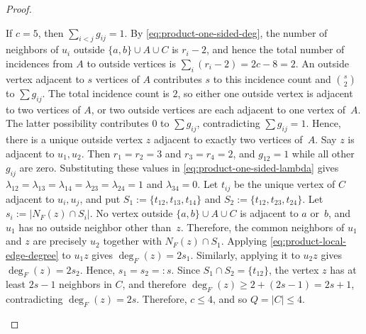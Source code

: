 \documentclass[10pt,a4paper]{amsart}
\begin{document}
\begin{proof}
\begin{itemize}
If $c=5$, then $\displaystyle \sum_{i<j}g_{ij}=1$.
By \eqref{eq:product-one-sided-deg}, the number of neighbors of $u_i$ outside $\{a,b\}\cup A\cup C$ is $r_i-2$, and hence the total number of incidences from $A$ to outside vertices is $\displaystyle \sum_i(r_i-2)=2c-8=2$.
An outside vertex adjacent to $s$ vertices of $A$ contributes $s$ to this incidence count and $\displaystyle \binom{s}{2}$ to $\displaystyle \sum g_{ij}$.
The total incidence count is $2$, so either one outside vertex is adjacent to two vertices of $A$, or two outside vertices are each adjacent to one vertex of~$A$.
The latter possibility contributes $0$ to $\displaystyle \sum g_{ij}$, contradicting $\displaystyle \sum g_{ij}=1$.
Hence, there is a unique outside vertex $z$ adjacent to exactly two vertices of~$A$.
Say $z$ is adjacent to $u_1,u_2$.
Then $r_1=r_2=3$ and $r_3=r_4=2$,
and $g_{12}=1$ while all other $g_{ij}$ are zero.
Substituting these values in \eqref{eq:product-one-sided-lambda} gives $\lambda_{12}=\lambda_{13}=\lambda_{14}=\lambda_{23}=\lambda_{24}=1$ and $\lambda_{34}=0$.
Let $t_{ij}$ be the unique vertex of $C$ adjacent to $u_i,u_j$, and put $S_1:=\{t_{12},t_{13},t_{14}\}$ and $S_2:=\{t_{12},t_{23},t_{24}\}$.
Let $s_i:=|N_F(z)\cap S_i|$.
No vertex outside $\{a,b\}\cup A\cup C$ is adjacent to $a$ or~$b$, and $u_1$ has no outside neighbor other than~$z$.
Therefore, the common neighbors of $u_1$ and $z$ are precisely $u_2$ together with $N_F(z)\cap S_1$.
Applying \eqref{eq:product-local-edge-degree} to $u_1z$ gives $\deg_F(z)=2s_1$.
Similarly, applying it to $u_2z$ gives $\deg_F(z)=2s_2$.
Hence, $s_1=s_2=:s$.
Since $S_1\cap S_2=\{t_{12}\}$, the vertex $z$ has at least $2s-1$ neighbors in $C$, and therefore $\deg_F(z)\ge 2+(2s-1)=2s+1$,
contradicting $\deg_F(z)=2s$.
Therefore, $c\le 4$, and so $Q=|C|\le 4$.


\end{itemize}
\end{proof}
\end{document}
